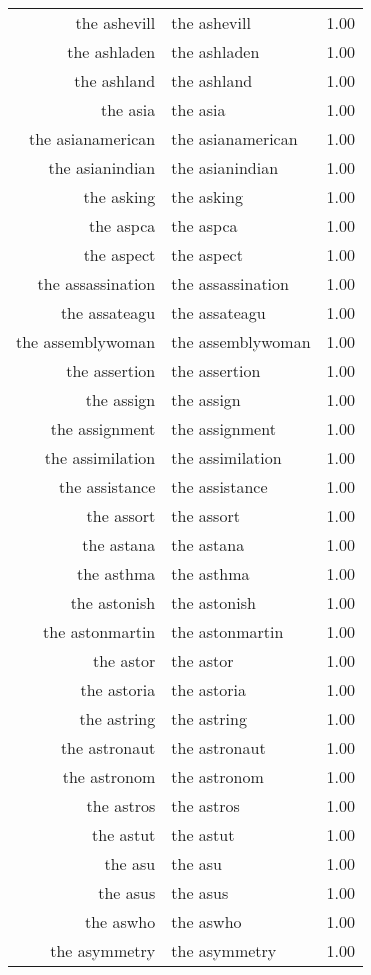 \begin{table}[ht]
\begin{tabular}{rlr}
  the ashevill & the ashevill & 1.00 \\ 
  the ashladen & the ashladen & 1.00 \\ 
  the ashland & the ashland & 1.00 \\ 
  the asia & the asia & 1.00 \\ 
  the asianamerican & the asianamerican & 1.00 \\ 
  the asianindian & the asianindian & 1.00 \\ 
  the asking & the asking & 1.00 \\ 
  the aspca & the aspca & 1.00 \\ 
  the aspect & the aspect & 1.00 \\ 
  the assassination & the assassination & 1.00 \\ 
  the assateagu & the assateagu & 1.00 \\ 
  the assemblywoman & the assemblywoman & 1.00 \\ 
  the assertion & the assertion & 1.00 \\ 
  the assign & the assign & 1.00 \\ 
  the assignment & the assignment & 1.00 \\ 
  the assimilation & the assimilation & 1.00 \\ 
  the assistance & the assistance & 1.00 \\ 
  the assort & the assort & 1.00 \\ 
  the astana & the astana & 1.00 \\ 
  the asthma & the asthma & 1.00 \\ 
  the astonish & the astonish & 1.00 \\ 
  the astonmartin & the astonmartin & 1.00 \\ 
  the astor & the astor & 1.00 \\ 
  the astoria & the astoria & 1.00 \\ 
  the astring & the astring & 1.00 \\ 
  the astronaut & the astronaut & 1.00 \\ 
  the astronom & the astronom & 1.00 \\ 
  the astros & the astros & 1.00 \\ 
  the astut & the astut & 1.00 \\ 
  the asu & the asu & 1.00 \\ 
  the asus & the asus & 1.00 \\ 
  the aswho & the aswho & 1.00 \\ 
  the asymmetry & the asymmetry & 1.00 \\ 

\end{tabular}
\end{table}
